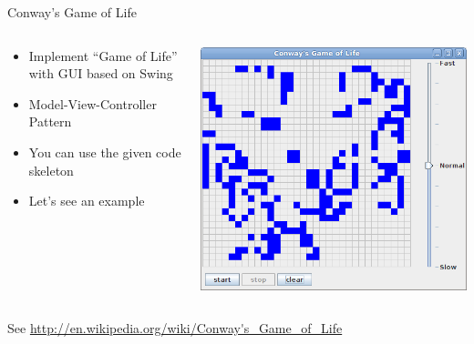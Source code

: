 \begin{frame}{Conway's Game of Life}
  \begin{columns}[c]
    \begin{column}{0.45\textwidth}
      \begin{itemize}
      \item Implement ``Game of Life'' with GUI based on Swing
      \item Model-View-Controller Pattern
      \item You can use the given code skeleton
      \item Let's see an example
      \end{itemize}
    \end{column}
    \begin{column}{0.55\textwidth}
      \begin{center}
        \includegraphics[width=\textwidth]{figures/gol}
      \end{center}
    \end{column}
  \end{columns}


  See \url{http://en.wikipedia.org/wiki/Conway's_Game_of_Life}
\end{frame}

